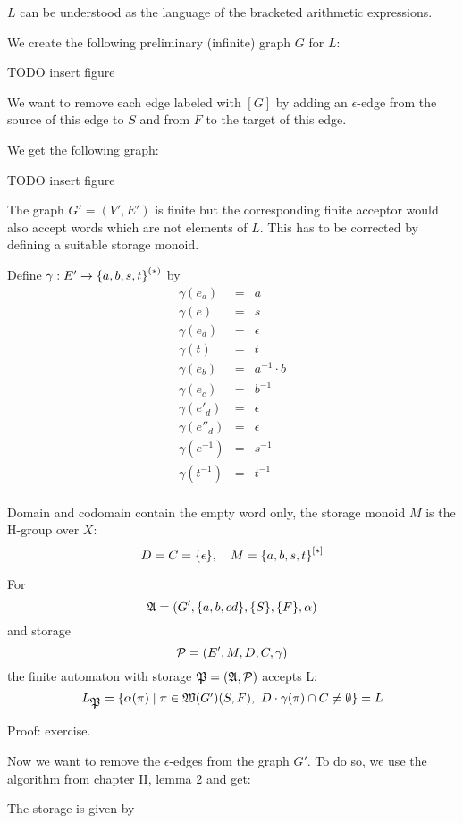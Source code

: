 $L$ can be understood as the language of the bracketed arithmetic expressions.

We create the following preliminary (infinite) graph $G$ for $L$:

TODO insert figure

We want to remove each edge labeled with $[G]$ by adding an $\epsilon$-edge
from the source of this edge to $S$ and from $F$ to the target of this edge.

We get the following graph:

TODO insert figure

The graph $G'=(V',E')$ is finite but the corresponding finite acceptor would
also accept words which are not elements of $L$. This has to be corrected by defining a
suitable storage monoid.

Define $\gamma: E' \to \mbox{${\mbox{$\{a, b, s, t\}$}}^{(*)}$}$ by
\begin{eqnarray*}
\gamma(e_a) & = & a \\
\gamma(e) & = & s \\
\gamma(e_d) & = & \epsilon \\
\gamma(t) & = & t \\
\gamma(e_b) & = & a^{-1} \cdot b \\
\gamma(e_c) & = & b^{-1} \\
\gamma(e'_d) & = & \epsilon \\
\gamma(e''_d) & = & \epsilon \\
\gamma(e^{-1}) & = & s^{-1} \\
\gamma(t^{-1}) & = & t^{-1} \\
\end{eqnarray*}

Domain and codomain contain the empty word only, the storage monoid $M$ is the
H-group over $X$:
\[ D = C = \mbox{$\{\epsilon\}$},\quad M = \mbox{${\mbox{$\{a, b, s, t\}$}}^{[*]}$} \]

For
\[ \mbox{$\mathfrak{A}$} = (G', \mbox{$\{a, b,c d\}$}, \mbox{$\{S\}$}, \mbox{$\{F\}$}, \alpha) \]
and storage 
\[ \mbox{$\mathcal{P}$} = (E', M, D, C, \gamma) \]
the finite automaton with storage $\mbox{$\mathfrak{P}$} = (\mbox{$\mathfrak{A}$}, \mbox{$\mathcal{P}$})$ accepts L:
\[ L_{\mbox{$\mathfrak{P}$}} = \mbox{$\{\alpha(\pi) \mid \pi \in \mbox{$\mathfrak{W}(G')$}(S, F),\ D \cdot
\gamma(\pi) \cap C \neq \emptyset\}$} = L \]

Proof: exercise.

Now we want to remove the $\epsilon$-edges from the graph $G'$. To do so, we use
the algorithm from chapter II, lemma 2 and get:

\missingfigure

The storage is given by


